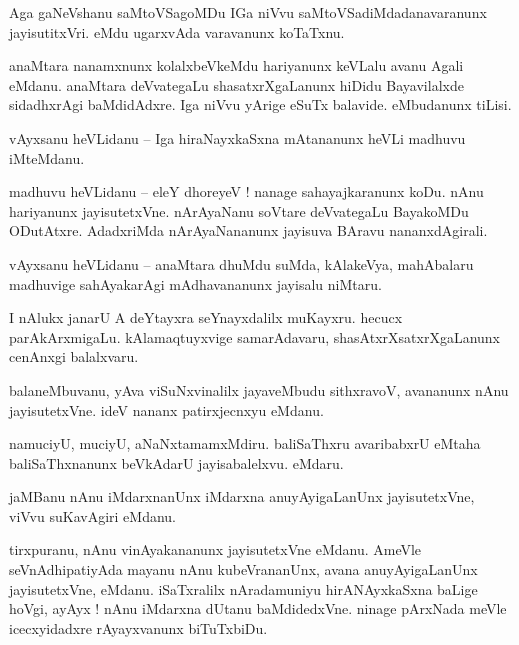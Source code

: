 \documentclass{article}
\begin{document}
\begin{mng}%
Aga gaNeVshanu saMtoVSagoMDu IGa niVvu saMtoVSadiMdadanavaranunx jayisutitxVri. eMdu ugarxvAda 
varavanunx koTaTxnu.
\end{mng}

\begin{mng}%
anaMtara nanamxnunx kolalxbeVkeMdu hariyanunx keVLalu avanu Agali eMdanu. anaMtara deVvategaLu 
shasatxrXgaLanunx hiDidu Bayavilalxde sidadhxrAgi baMdidAdxre. Iga  niVvu yArige eSuTx balavide. 
eMbudanunx tiLisi.
\end{mng}

\begin{mng}%
vAyxsanu heVLidanu -- Iga hiraNayxkaSxna mAtananunx heVLi madhuvu iMteMdanu.
\end{mng}

\begin{mng}%
madhuvu heVLidanu -- eleY dhoreyeV ! nanage sahayajkaranunx koDu. nAnu hariyanunx jayisutetxVne. 
nArAyaNanu soVtare deVvategaLu BayakoMDu ODutAtxre. AdadxriMda nArAyaNananunx jayisuva BAravu 
nananxdAgirali.
\end{mng}

\begin{mng}%
vAyxsanu heVLidanu -- anaMtara dhuMdu suMda, kAlakeVya, mahAbalaru madhuvige sahAyakarAgi 
mAdhavananunx jayisalu niMtaru.
\end{mng}

\begin{mng}%
I nAlukx janarU A deYtayxra seYnayxdalilx muKayxru. hecucx parAkArxmigaLu. kAlamaqtuyxvige 
samarAdavaru, shasAtxrXsatxrXgaLanunx cenAnxgi balalxvaru.
\end{mng}

\begin{mng}%
balaneMbuvanu, yAva viSuNxvinalilx jayaveMbudu sithxravoV, avananunx nAnu jayisutetxVne. ideV 
nananx patirxjecnxyu eMdanu.
\end{mng}

\begin{mng}%
namuciyU, muciyU, aNaNxtamamxMdiru. baliSaThxru avaribabxrU eMtaha baliSaThxnanunx beVkAdarU 
jayisabalelxvu. eMdaru.
\end{mng}

\begin{mng}%
jaMBanu nAnu iMdarxnanUnx iMdarxna anuyAyigaLanUnx jayisutetxVne, viVvu suKavAgiri eMdanu.
\end{mng}

\begin{mng}%
tirxpuranu, nAnu vinAyakananunx jayisutetxVne eMdanu. AmeVle seVnAdhipatiyAda mayanu nAnu 
kubeVrananUnx, avana anuyAyigaLanUnx jayisutetxVne, eMdanu. iSaTxralilx nAradamuniyu 
hirANAyxkaSxna baLige hoVgi, ayAyx ! nAnu iMdarxna dUtanu baMdidedxVne. ninage pArxNada meVle 
icecxyidadxre rAyayxvanunx biTuTxbiDu.
\end{mng}
\end{document}
